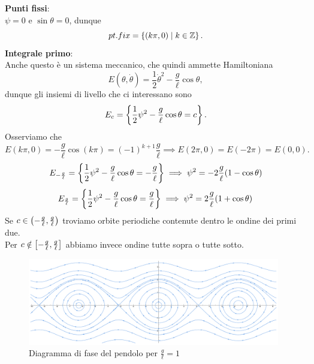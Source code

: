 \noindent
\textbf{Punti fissi}:\\
$\psi=0$ e $\sin\theta=0$, dunque
\[pt.fix=\left\{{(k\pi,0)\mid k\in\mathbb{Z}}\right\}.\]
\textbf{Integrale primo}:\\
Anche questo \`e un sistema meccanico, che quindi ammette Hamiltoniana
\[E(\theta,\dot\theta)=\frac12\dot\theta^2-\frac g\ell\cos\theta,\]
dunque gli insiemi di livello che ci interessano sono
\[E_c=\left\{{\frac12\psi^2-\frac g\ell\cos\theta=c}\right\}.\]
Osserviamo che
\[E(k\pi,0)=-\frac g\ell\cos(k\pi)=(-1)^{k+1}\frac g\ell\implies E(2\pi,0)=E(-2\pi)=E(0,0).\]
\[E_{-\frac{g}{\ell}}=\left\{{\frac12\psi^2-\frac g\ell\cos\theta=-\frac{g}{\ell}}\right\}\implies \psi^2=-2\frac g\ell(1-\cos\theta)\]
\[E_{\frac{g}{\ell}}=\left\{{\frac12\psi^2-\frac g\ell\cos\theta=\frac{g}{\ell}}\right\}\implies \psi^2=2\frac g\ell(1+\cos\theta)\]
Se $c\in\left({-\frac g\ell,\frac g\ell}\right)$ troviamo orbite periodiche contenute dentro le ondine dei primi due.\\
Per $c\notin \left[{-\frac g\ell,\frac g\ell}\right]$ abbiamo invece ondine tutte sopra o tutte sotto.
\begin{figure}[!htb]
    \centering
    \includegraphics[width=11cm]{Immagini/pendolo.pdf}
    \caption{Diagramma di fase del pendolo per $\frac g\ell=1$}
\end{figure}



